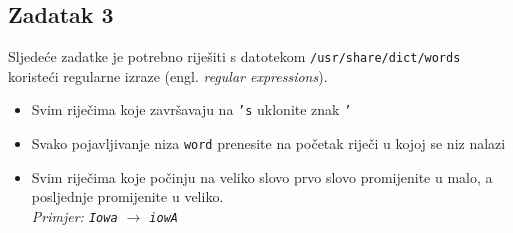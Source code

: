 \documentclass[12pt,a4paper]{article}
\newcommand{\shell}[1]{\texttt{#1}}
\begin{document}
	\subsection*{Zadatak 3}
	Sljedeće zadatke je potrebno riješiti s datotekom \shell{/usr/share/dict/words} koristeći regularne izraze (engl. \emph{regular expressions}).
	\begin{itemize}
		\item Svim riječima koje završavaju na \shell{'s} uklonite znak \shell{'}
		\item Svako pojavljivanje niza \shell{word} prenesite na početak riječi u kojoj se niz nalazi
		\item Svim riječima koje počinju na veliko slovo prvo slovo promijenite u malo, a posljednje promijenite u veliko. \\ \emph{Primjer: \shell{Iowa} $\longrightarrow$ \shell{iowA}}
	\end{itemize}
\end{document}
